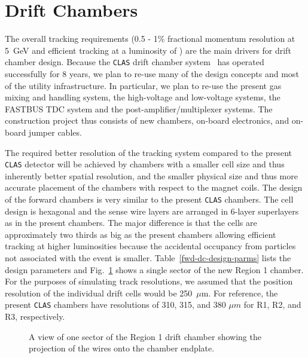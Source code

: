 
\section{Drift Chambers}

The overall tracking requirements (0.5 -  1\% fractional momentum resolution 
at 5~GeV and efficient tracking at a luminosity of ) are the main
drivers for drift chamber design.  Because the {\tt CLAS} drift chamber
system~\cite{dcnim} has operated successfully for 8 years, we plan to 
re-use many of the design concepts and most of the utility infrastructure.  
In particular, we plan to re-use the present gas mixing and handling system, 
the high-voltage and low-voltage systems, the FASTBUS TDC system and the 
post-amplifier/multiplexer systems.  The construction project thus consists 
of new chambers, on-board electronics, and on-board jumper cables.

The required better resolution of the tracking system compared to the 
present {\tt CLAS} detector will be achieved by chambers with a smaller 
cell size and thus inherently better spatial resolution, and the smaller 
physical size and thus more accurate placement of the chambers with respect 
to the magnet coils.  The design of the forward chambers is very similar to 
the present {\tt CLAS} chambers.  The cell design is hexagonal and the sense 
wire layers are arranged in 6-layer superlayers as in the present chambers. 
The major difference is that the cells are approximately two thirds as big 
as the present chambers allowing efficient tracking at higher luminosities 
because the accidental occupancy from particles not associated with the 
event is smaller. Table~\ref{fwd-dc-design-parms} lists the design 
parameters and Fig.~\ref{fwddc} shows a single sector of the new Region 1
chamber.  For the purposes of simulating track resolutions, we assumed that 
the position resolution of the individual drift cells would be 250~$\mu$m.  
For reference, the present {\tt CLAS} chambers have resolutions of 310, 315,
and 380 $\mu m$ for R1, R2, and R3, respectively.

\begin{figure}[htbp]
\vspace{9.0cm}
\caption{\small{A view of one sector of the Region 1 drift chamber 
showing the projection of the wires onto the chamber endplate.}}
\label{fwddc}
\end{figure}


